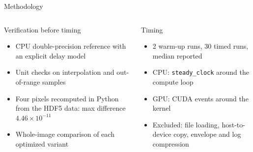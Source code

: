 \documentclass[aspectratio=169,10pt]{beamer}
\begin{document}
\begin{frame}{Methodology}
  \begin{columns}[T,onlytextwidth]
    \begin{block}{Verification before timing}
      \small
      \begin{itemize}\setlength\itemsep{.3em}
        \item CPU double-precision reference with an explicit delay model
        \item Unit checks on interpolation and out-of-range samples
        \item Four pixels recomputed in Python from the HDF5 data: max difference $4.46\times10^{-11}$
        \item Whole-image comparison of each optimized variant
      \end{itemize}
    \end{block}
    \begin{block}{Timing}
      \small
      \begin{itemize}\setlength\itemsep{.3em}
        \item 2 warm-up runs, 30 timed runs, median reported
        \item CPU: \texttt{steady\_clock} around the compute loop
        \item GPU: CUDA events around the kernel
        \item Excluded: file loading, host-to-device copy, envelope and log compression
      \end{itemize}
    \end{block}
  \end{columns}
\end{frame}
\end{document}
